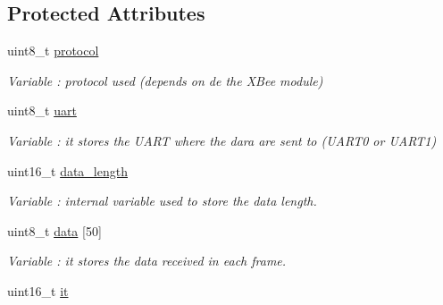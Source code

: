 \subsection*{Protected Attributes}
\begin{DoxyCompactItemize}
\item 
uint8\+\_\+t \hyperlink{class_wasp_x_bee_core_a3135b07fac166669fa1589c443edee8b}{protocol}\hypertarget{class_wasp_x_bee_core_a3135b07fac166669fa1589c443edee8b}{}\label{class_wasp_x_bee_core_a3135b07fac166669fa1589c443edee8b}

\begin{DoxyCompactList}\small\item\em Variable \+: protocol used (depends on de the X\+Bee module) \end{DoxyCompactList}\item 
uint8\+\_\+t \hyperlink{class_wasp_x_bee_core_a1b31c62bcb1bb1e6080ddc668419f729}{uart}\hypertarget{class_wasp_x_bee_core_a1b31c62bcb1bb1e6080ddc668419f729}{}\label{class_wasp_x_bee_core_a1b31c62bcb1bb1e6080ddc668419f729}

\begin{DoxyCompactList}\small\item\em Variable \+: it stores the U\+A\+RT where the dara are sent to (U\+A\+R\+T0 or U\+A\+R\+T1) \end{DoxyCompactList}\item 
uint16\+\_\+t \hyperlink{class_wasp_x_bee_core_abc8016084138fe49865c9ca6b7c5a6f6}{data\+\_\+length}\hypertarget{class_wasp_x_bee_core_abc8016084138fe49865c9ca6b7c5a6f6}{}\label{class_wasp_x_bee_core_abc8016084138fe49865c9ca6b7c5a6f6}

\begin{DoxyCompactList}\small\item\em Variable \+: internal variable used to store the data length. \end{DoxyCompactList}\item 
uint8\+\_\+t \hyperlink{class_wasp_x_bee_core_a81f1c2af5c45fc8e3b63f8f21b3df17f}{data} \mbox{[}50\mbox{]}\hypertarget{class_wasp_x_bee_core_a81f1c2af5c45fc8e3b63f8f21b3df17f}{}\label{class_wasp_x_bee_core_a81f1c2af5c45fc8e3b63f8f21b3df17f}

\begin{DoxyCompactList}\small\item\em Variable \+: it stores the data received in each frame. \end{DoxyCompactList}\item 
uint16\+\_\+t \hyperlink{class_wasp_x_bee_core_a6793052c84d27c1d9818aaafa8e96353}{it}\hypertarget{class_wasp_x_bee_core_a6793052c84d27c1d9818aaafa8e96353}{}\label{class_wasp_x_bee_core_a6793052c84d27c1d9818aaafa8e96353}


\end{DoxyCompactItemize}
